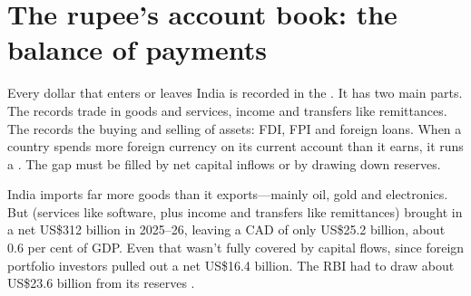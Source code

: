 \section{The rupee's account book: the balance of payments}\label{sec:bop}

Every dollar that enters or leaves India is recorded in the .\cite{ncert2007} It has two main parts. The  records trade in goods and services, income and transfers like remittances. The  records the buying and selling of assets: FDI, FPI and foreign loans. When a country spends more foreign currency on its current account than it earns, it runs a . The gap must be filled by net capital inflows or by drawing down reserves.\cite{ncert2007}

India imports far more goods than it exports---mainly oil, gold and electronics. But  (services like software, plus income and transfers like remittances) brought in a net US\$312 billion in 2025--26, leaving a CAD of only US\$25.2 billion, about 0.6 per cent of GDP.\cite{rbi2026b} Even that wasn't fully covered by capital flows, since foreign portfolio investors pulled out a net US\$16.4 billion. The RBI had to draw about US\$23.6 billion from its reserves .
